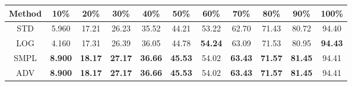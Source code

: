 \documentclass{standalone}
\begin{document}
\begin{tabular}{c|cccccccccc}
      \toprule
      Method & 10\% & 20\% & 30\% & 40\% & 50\% & 60\% & 70\% & 80\% & 90\% & 100\% \\
      \midrule
STD & 5.960 & 17.21 & 26.23 & 35.52 & 44.21 & 53.22 & 62.70 & 71.43 & 80.72 & 94.40\\
LOG & 4.160 & 17.31 & 26.39 & 36.05 & 44.78 & \textbf{54.24} & 63.09 & 71.53 & 80.95 & \textbf{94.43}\\
SMPL & \textbf{8.900} & \textbf{18.17} & \textbf{27.17} & \textbf{36.66} & \textbf{45.53} & 54.02 & \textbf{63.43} & \textbf{71.57} & \textbf{81.45} & 94.41\\
ADV & \textbf{8.900} & \textbf{18.17} & \textbf{27.17} & \textbf{36.66} & \textbf{45.53} & 54.02 & \textbf{63.43} & \textbf{71.57} & \textbf{81.45} & 94.41\\
  \bottomrule
\end{tabular}
\end{document}
